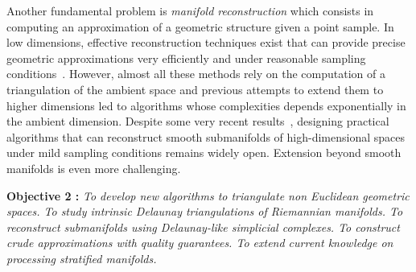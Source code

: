 Another fundamental problem is {\em manifold reconstruction} which consists in computing an approximation of a geometric structure given a point sample.  In low dimensions, effective reconstruction techniques exist that can provide precise geometric approximations very efficiently and under reasonable sampling conditions~\cite{dey-csr-2007}. %
However,   almost all these methods rely on the computation of a triangulation of the ambient space and previous attempts to extend them to higher dimensions led to algorithms whose complexities depends exponentially in the ambient dimension.  Despite some very recent results~\cite{geometrica-7142i}, designing practical algorithms that can reconstruct smooth submanifolds of high-dimensional spaces under mild sampling conditions remains widely open. Extension beyond smooth manifolds is even more challenging.


\vspace{2mm}

{\bf Objective 2 :}  {\em To   develop new algorithms to {\em  triangulate non Euclidean geometric spaces}. To study intrinsic Delaunay triangulations of Riemannian manifolds.  To reconstruct submanifolds using Delaunay-like simplicial complexes. To construct crude approximations 
with quality guarantees. To extend current knowledge on processing stratified manifolds. }

